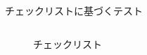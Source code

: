 \begin{frame}[shrink=15]{チェックリストに基づくテスト}
\begin{columns}[t]
\begin{column}{.35\textwidth}
\begin{figure}
        \begin{center}
            \begin{overlayarea}{\textwidth}{0.6\textheight}
            \begin{center}
            \end{center}
            \end{overlayarea}
        \caption{チェックリスト}
        \end{center}
        \end{figure}
    \end{column}
\end{columns}
\end{frame}
